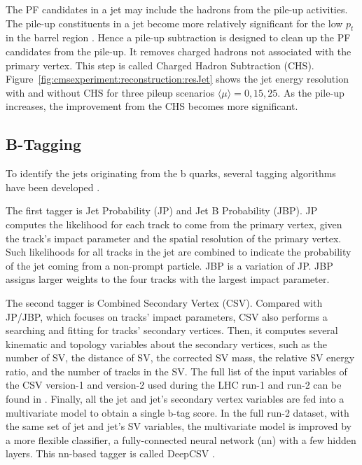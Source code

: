 The PF candidates in a jet may include the hadrons from the pile-up activities. The pile-up constituents in a jet become more relatively significant for the low $p_t$ in the barrel region \cite{cms:particleflow:Sirunyan:2017ulk}. Hence a pile-up subtraction is designed to clean up the PF candidates from the pile-up. It removes charged hadrons not associated with the primary vertex. This step is called Charged Hadron Subtraction (CHS). Figure~\ref{fig:cmsexperiment:reconstruction:resJet} shows the jet energy resolution with and without CHS for three pileup scenarios $\langle \mu\rangle =0,15,25$. As the pile-up increases, the improvement from the CHS becomes more significant.  





\subsection{B-Tagging}

To identify the jets originating from the b quarks, several tagging algorithms have been developed \cite{Chatrchyan:2012jua, Sirunyan:2017ezt, Bols:2020bkb}. 

The first tagger is Jet Probability (JP) and Jet B Probability (JBP). JP computes the likelihood for each track to come from the primary vertex, given the track's impact parameter and the spatial resolution of the primary vertex. Such likelihoods for all tracks in the jet are combined to indicate the probability of the jet coming from a non-prompt particle. JBP is a variation of JP. JBP assigns larger weights to the four tracks with the largest impact parameter. 

The second tagger is Combined Secondary Vertex (CSV). Compared with JP/JBP, which focuses on tracks' impact parameters, CSV also performs a searching and fitting for tracks' secondary vertices. Then, it computes several kinematic and topology variables about the secondary vertices, such as the number of SV, the distance of SV, the corrected SV mass, the relative SV energy ratio, and the number of tracks in the SV. The full list of the input variables of the CSV version-1 and version-2 used during the LHC run-1 and run-2 can be found in \cite{Sirunyan:2017ezt}. Finally, all the jet and jet's secondary vertex variables are fed into a multivariate model to obtain a single b-tag score. In the full run-2 dataset, with the same set of jet and jet's SV variables, the multivariate model is improved by a more flexible classifier, a fully-connected neural network (nn) with a few hidden layers. This nn-based tagger is called DeepCSV \cite{Bols:2020bkb}.

